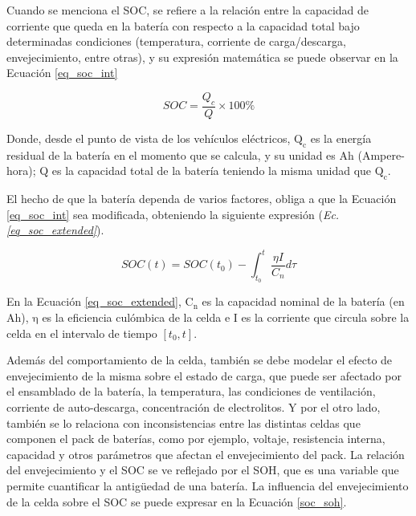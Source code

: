 \noindent Cuando se menciona el \acrshort{SOC}, se refiere a la relaci\'on entre
la capacidad de corriente que queda en la bater\'ia con respecto a la capacidad
total bajo determinadas condiciones (temperatura, corriente de carga/descarga,
envejecimiento, entre otras), y su expresi\'on matem\'atica se puede observar en
la Ecuaci\'on \ref{eq_soc_int}

\begin{equation}
    SOC = \frac{Q_c}{Q}\times100\% 
    \label{eq_soc_int}
\end{equation}

\newpage

\noindent Donde, desde el punto de vista de los veh\'iculos el\'ectricos,
$\mathrm{Q_c}$ es la energía residual de la bater\'ia en el momento que se
calcula, y su unidad es Ah (Ampere-hora); Q es la capacidad total de la
bater\'ia teniendo la misma unidad que $\mathrm{Q_c}$.

\noindent El hecho de que la bater\'ia dependa de varios factores, obliga a que
la Ecuaci\'on \ref{eq_soc_int} sea modificada, obteniendo la siguiente 
expresi\'on (\emph{Ec. \ref{eq_soc_extended}}).

\begin{equation}
    SOC(t) = SOC(t_0) - \int_{t_0}^t \frac{\eta I}{C_n }d\tau
    \label{eq_soc_extended}
\end{equation}

\noindent En la Ecuaci\'on \ref{eq_soc_extended}, $\mathrm{C_n}$ es la 
capacidad nominal de la bater\'ia (en Ah), $\mathrm{\eta}$ es la eficiencia 
cul\'ombica de la celda e I es la corriente que circula sobre la celda en el 
intervalo de tiempo $[t_{0}, t]$.

\noindent Adem\'as del comportamiento de la celda, tambi\'en se debe modelar el
efecto de envejecimiento de la misma sobre el estado de carga, que puede ser
afectado por el ensamblado de la bater\'ia, la temperatura,  las condiciones de
ventilaci\'on, corriente de auto-descarga, concentraci\'on de electrolitos. Y por
el otro lado, tambi\'en se lo relaciona con inconsistencias entre las distintas
celdas que componen el pack de bater\'ias, como por ejemplo, voltaje,
resistencia interna, capacidad y otros parámetros que afectan el 
envejecimiento del pack. La relaci\'on del envejecimiento y el \acrshort{SOC} se
ve reflejado por el \acrshort{SOH}, que es una variable que permite cuantificar
la antigüedad de una bater\'ia. La influencia del envejecimiento de la celda
sobre el \acrshort{SOC} se puede expresar en la Ecuaci\'on \ref{soc_soh}.

